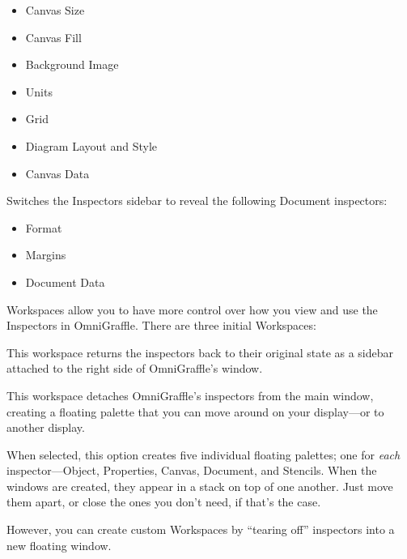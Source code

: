 \documentclass[../main.tex]{subfiles}
\begin{document}
\begin{description}[style=nextline]
\begin{description}[style=nextline]
          \begin{itemize}
            \item Canvas Size
            \item Canvas Fill
            \item Background Image
            \item Units
            \item Grid
            \item Diagram Layout and Style
            \item Canvas Data
          \end{itemize}
        \item[{Document (\textbf{Command--4})}] Switches the Inspectors sidebar to reveal the
          following Document inspectors:

          \begin{itemize}
            \item Format
            \item Margins
            \item Document Data
          \end{itemize}
      \end{description}
    \item[{Workspaces}] Workspaces allow you to have more control over how you view and use the
      Inspectors in OmniGraffle. There are three initial Workspaces:

      \begin{description}[style=nextline]
        \item[{Sidebar (\textbf{F2})}] This workspace returns the inspectors back to their original
          state as a sidebar attached to the right side of OmniGraffle's window.
        \item[{Floating (\textbf{F3})}] This workspace detaches OmniGraffle's inspectors from the
          main window, creating a floating palette that you can move around on your display---or to
          another display.
        \item[{Palettes (\textbf{F4})}] When selected, this option creates five individual floating
          palettes; one for \textit{each} inspector---Object, Properties, Canvas, Document, and
          Stencils. When the windows are created, they appear in a stack on top of one another. Just
          move them apart, or close the ones you don't need, if that's the case.
      \end{description}
    \item[{}] However, you can create custom Workspaces by ``tearing off'' inspectors into a new
      floating window.
  \end{description}
\end{document}
